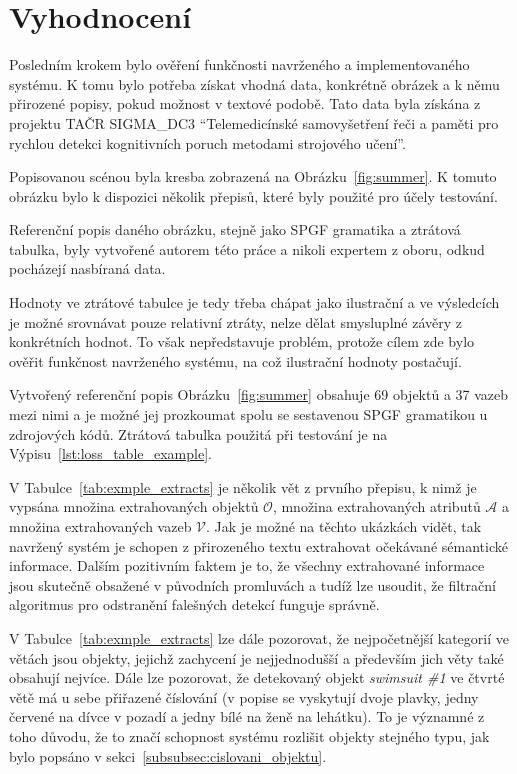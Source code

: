 \clearpage
\section{Vyhodnocení}
\def\projekt{TAČR SIGMA\_DC3 \enquote{Telemedicínské samovyšetření řeči a paměti pro rychlou detekci kognitivních poruch metodami strojového učení}}
Posledním krokem bylo ověření funkčnosti navrženého a implementovaného systému.
K tomu bylo potřeba získat vhodná data, konkrétně obrázek a k němu přirozené popisy, pokud možnost v textové podobě.
Tato data byla získána z projektu \projekt.

Popisovanou scénou byla kresba zobrazená na Obrázku~\ref{fig:summer}.
K tomuto obrázku bylo k dispozici několik přepisů, které byly použité pro účely testování.

Referenční popis daného obrázku, stejně jako SPGF gramatika a ztrátová tabulka,
byly vytvořené autorem této práce a nikoli expertem z oboru, odkud pocházejí nasbíraná data.

Hodnoty ve ztrátové tabulce je tedy třeba chápat jako ilustrační a ve výsledcích je možné srovnávat pouze relativní ztráty,
nelze dělat smysluplné závěry z konkrétních hodnot.
To však nepředstavuje problém, protože cílem zde bylo ověřit funkčnost navrženého systému, na což ilustrační hodnoty postačují.

Vytvořený referenční popis Obrázku~\ref{fig:summer} obsahuje 69 objektů a 37 vazeb mezi nimi a je možné jej prozkoumat spolu se sestavenou SPGF gramatikou u zdrojových kódů.
Ztrátová tabulka použitá při testování je na Výpisu~\ref{lst:loss_table_example}.

% 
V Tabulce~\ref{tab:exmple_extracts} je několik vět z prvního přepisu, k nimž je vypsána množina extrahovaných objektů $\mathcal{O}$,
množina extrahovaných atributů $\mathcal A$ a množina extrahovaných vazeb $\mathcal V$.
Jak je možné na těchto ukázkách vidět, tak navržený systém je schopen z přirozeného textu extrahovat očekávané sémantické informace.
Dalším pozitivním faktem je to, že všechny extrahované informace jsou skutečně obsažené v původních promluvách a tudíž lze usoudit, že filtrační
algoritmus pro odstranění falešných detekcí funguje správně.



V Tabulce~\ref{tab:exmple_extracts} lze dále pozorovat, že nejpočetnější kategorií ve větách jsou objekty, jejichž zachycení je nejjednodušší a především jich věty také obsahují nejvíce.
Dále lze pozorovat, že detekovaný objekt \emph{swimsuit \#1} ve čtvrté větě má u sebe přiřazené číslování (v popise se vyskytují dvoje plavky, jedny červené na dívce v pozadí
a jedny bílé na ženě na lehátku).
To je významné z toho důvodu, že to značí schopnost systému rozlišit objekty stejného typu, jak bylo popsáno v sekci~\ref{subsubsec:cislovani_objektu}.

